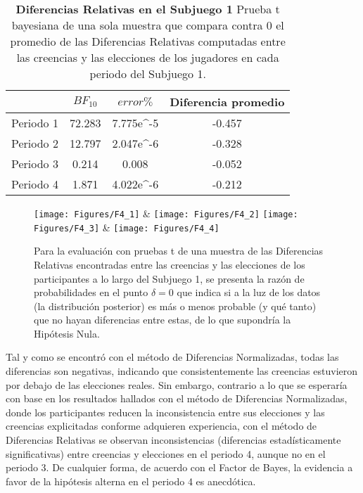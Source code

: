 \begin{table}[h]
\caption[Diferencias Relativas en el Subjuego 1 (prueba t de una muestra)]{\textbf{Diferencias Relativas en el Subjuego 1} Prueba t bayesiana de una sola muestra que compara contra 0 el promedio de las Diferencias Relativas computadas entre las creencias y las elecciones de los jugadores en cada periodo del Subjuego 1.}
\label{DR-S1-B}
\centering
\begin{tabular}{l | c c | c}
\toprule
\textbf{} & \textbf{$BF_{10}$} & \textbf{$error\%$} & \textbf{Diferencia promedio}\\
\midrule
Periodo 1 & 72.283 & 7.775e^-5 & -0.457\\
Periodo 2 & 12.797 & 2.047e^-6 & -0.328\\
Periodo 3 & 0.214 & 0.008 & -0.052\\
Periodo 4 & 1.871 & 4.022e^-6 & -0.212\\
\bottomrule
\end{tabular}
\end{table}
	


\begin{figure}[h]
\centering
\texttt{[image: Figures/F4\_1]} & \texttt{[image: Figures/F4\_2]} 
\texttt{[image: Figures/F4\_3]} & \texttt{[image: Figures/F4\_4]} 
\decoRule
\caption[Diferencias Relativas entre creencias y elecciones en el Subjuego 1 (Factor de Bayes)]{Para la evaluación con pruebas t de una muestra de las Diferencias Relativas encontradas entre las creencias y las elecciones de los participantes a lo largo del Subjuego 1, se presenta la razón de probabilidades en el punto $\delta = 0$ que indica si a la luz de los datos (la distribución posterior) es más o menos probable (y qué tanto) que no hayan diferencias entre estas, de lo que supondría la Hipótesis Nula.}
\label{fig:DR_S1}
\end{figure}

Tal y como se encontró con el método de Diferencias Normalizadas, todas las diferencias son negativas, indicando que consistentemente las creencias estuvieron por debajo de las elecciones reales. Sin embargo, contrario a lo que se esperaría con base en los resultados hallados con el método de Diferencias Normalizadas, donde los participantes reducen la inconsistencia entre sus elecciones y las creencias explicitadas conforme adquieren experiencia, con el método de Diferencias Relativas se observan inconsistencias (diferencias estadísticamente significativas) entre creencias y elecciones en el periodo 4, aunque no en el periodo 3. De cualquier forma, de acuerdo con el Factor de Bayes, la evidencia a favor de la hipótesis alterna en el periodo 4 es anecdótica.\\

